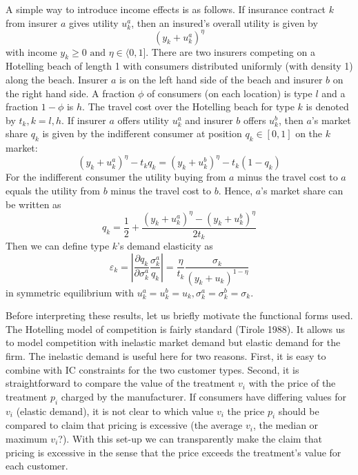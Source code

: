 \documentclass[a4paper,12pt]{article}
\makeatletter
\newcommand{\citeprocitem}[2]{\hyper@linkstart{cite}{citeproc_bib_item_#1}#2\hyper@linkend}
\makeatother
\begin{document}
A simple way to introduce income effects is as follows. If insurance contract \(k\) from insurer \(a\) gives utility \(u_k^a\), then an insured's overall utility is given by
\begin{equation}
\label{eq:50}
(y_k+u_k^a)^{\eta}
\end{equation}
with income \(y_k \ge 0 \text{ and } \eta \in \langle 0,1]\). There are two insurers competing on a Hotelling beach of length 1 with consumers distributed uniformly (with density 1) along the beach. Insurer \(a\) is on the left hand side of the beach and insurer \(b\) on the right hand side. A fraction \(\phi\) of consumers (on each location) is type \(l\) and a fraction \(1-\phi\) is \(h\). The travel cost over the Hotelling beach for type \(k\) is denoted by \(t_k, k=l,h\). If insurer \(a\) offers utility \(u_k^a\) and insurer \(b\) offers \(u_k^b\), then \(a\)'s market share \(q_k\) is given by the indifferent consumer at position \(q_k \in [0,1]\) on the \(k\) market:
\begin{equation}
\label{eq:18}
(y_k+u_k^a)^{\eta} - t_k q_k = (y_k+u_k^b)^{\eta} - t_k (1-q_k)
\end{equation}
For the indifferent consumer the utility buying from \(a\) minus the travel cost to \(a\) equals the utility from \(b\) minus the travel cost to \(b\). Hence, \(a\)'s market share can be written as
\begin{equation}
\label{eq:19}
q_k = \frac{1}{2} + \frac{(y_k+u_k^a)^{\eta} - (y_k+u_k^b)^{\eta}}{2t_k}
\end{equation}
Then we can define type \(k\)'s demand elasticity as
\begin{equation}
\label{eq:51}
\varepsilon_k = \left| \frac{\partial q_k}{\partial \sigma_k^a} \frac{\sigma_k^a}{q_k} \right| = \frac{\eta}{t_k}\frac{\sigma_k}{(y_k+u_k)^{1-\eta}}
\end{equation}
in symmetric equilibrium with \(u_k^a=u_k^b=u_k,\sigma_k^a=\sigma_k^{b}=\sigma_k\).

Before interpreting these results, let us briefly motivate the functional forms used. The Hotelling model of competition is fairly standard (\citeprocitem{44}{Tirole 1988}). It allows us to model competition with inelastic market demand but elastic demand for the firm. The inelastic demand is useful here for two reasons. First, it is easy to combine with IC constraints for the two customer types. Second, it is straightforward to compare the value of the treatment \(v_i\) with the price of the treatment \(p_i\) charged by the manufacturer. If consumers have differing values for \(v_i\) (elastic demand), it is not clear to which value \(v_i\) the price \(p_i\) should be compared to claim that pricing is excessive (the average \(v_{i}\), the median or maximum \(v_i\)?). With this set-up we can transparently make the claim that pricing is excessive in the sense that the price exceeds the treatment's value for each customer.
\end{document}
